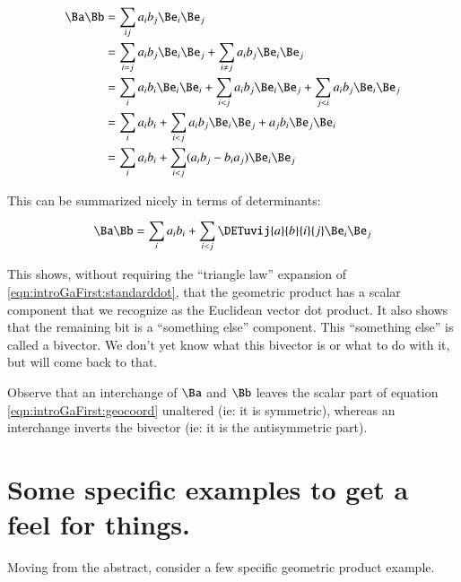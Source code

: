 \begin{align*}
\Ba\Bb 
&= \sum_{ij}{a_i b_j \Be_i \Be_j} \\
&= \sum_{i = j} {a_i b_j \Be_i \Be_j} 
 + \sum_{i \ne j} {a_i b_j \Be_i \Be_j} \\
&= \sum_{i} {a_i b_i \Be_i \Be_i} 
 + \sum_{i < j} a_i b_j \Be_i \Be_j
 + \sum_{j < i} a_i b_j \Be_i \Be_j \\
&= \sum_{i} {a_i b_i} 
 + \sum_{i < j} a_i b_j \Be_i \Be_j + a_j b_i \Be_j \Be_i \\
&= \sum_{i} {a_i b_i} 
 + \sum_{i < j} (a_i b_j - b_i a_j)\Be_i \Be_j \\
\end{align*}

This can be summarized nicely in terms of determinants:

\begin{equation}\label{eqn:introGaFirst:geocoord}
\Ba\Bb = \sum_{i} {a_i b_i} + \sum_{i < j} \DETuvij{a}{b}{i}{j} \Be_i \Be_j
\end{equation}

This shows,
without requiring the ``triangle law'' expansion of \ref{eqn:introGaFirst:standarddot},
that the geometric product has a scalar component that we recognize as the Euclidean vector dot product.  It also shows that the remaining bit 
is a ``something else'' component.  This ``something else'' is called a bivector.  We don't yet know what this bivector is or what to do with it,
but will come back to that.

Observe that an interchange of $\Ba$ and $\Bb$ leaves the scalar part of equation
\ref{eqn:introGaFirst:geocoord} unaltered (ie: it is symmetric), whereas an interchange inverts the bivector (ie: it is the antisymmetric part).

\section{Some specific examples to get a feel for things. }

Moving from the abstract, consider a few specific geometric product example.

